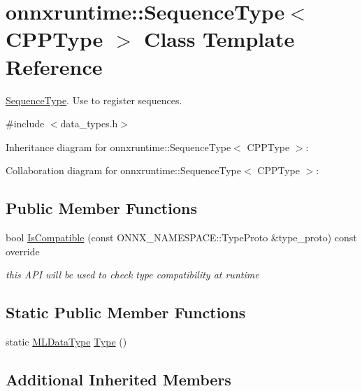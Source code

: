 \hypertarget{classonnxruntime_1_1SequenceType}{}\section{onnxruntime\+:\+:Sequence\+Type$<$ C\+P\+P\+Type $>$ Class Template Reference}
\label{classonnxruntime_1_1SequenceType}


\mbox{\hyperlink{classonnxruntime_1_1SequenceType}{Sequence\+Type}}. Use to register sequences.  




{\ttfamily \#include $<$data\+\_\+types.\+h$>$}



Inheritance diagram for onnxruntime\+:\+:Sequence\+Type$<$ C\+P\+P\+Type $>$\+:


Collaboration diagram for onnxruntime\+:\+:Sequence\+Type$<$ C\+P\+P\+Type $>$\+:
\subsection*{Public Member Functions}
\begin{DoxyCompactItemize}
\item 
bool \mbox{\hyperlink{classonnxruntime_1_1SequenceType_afb9213564cca50fa7ad862aea0bca547}{Is\+Compatible}} (const O\+N\+N\+X\+\_\+\+N\+A\+M\+E\+S\+P\+A\+C\+E\+::\+Type\+Proto \&type\+\_\+proto) const override
\begin{DoxyCompactList}\small\item\em this A\+PI will be used to check type compatibility at runtime \end{DoxyCompactList}\end{DoxyCompactItemize}
\subsection*{Static Public Member Functions}
\begin{DoxyCompactItemize}
\item 
static \mbox{\hyperlink{namespaceonnxruntime_ad77d0a6e838ec7da5dc35fed5ee66b49}{M\+L\+Data\+Type}} \mbox{\hyperlink{classonnxruntime_1_1SequenceType_a0dcda7dce2a65f8cb0a82a6bcb891e5a}{Type}} ()
\end{DoxyCompactItemize}
\subsection*{Additional Inherited Members}


